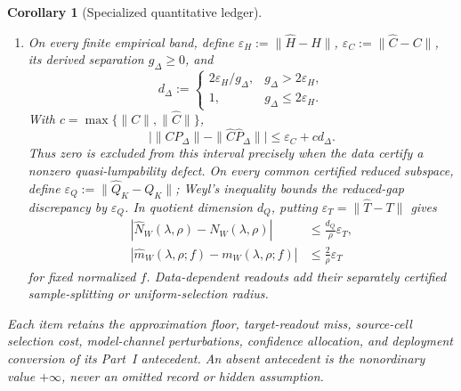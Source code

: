 \documentclass[11pt]{article}
\numberwithin{section}{part}
\theoremstyle{plain}
\newtheorem{corollary}[corollary]{Corollary}
\theoremstyle{definition}
\theoremstyle{remark}
\begin{document}
\begin{corollary}[Specialized quantitative ledger]
\begin{enumerate}[label=\textup{(\roman*)}]
\eqref{eq:wick-effective-dimension-monotone-limit}.  Operator approximation
errors on the \(d_n\)-dimensional carrier are charged by
\eqref{eq:wick-effective-dimension-interval}.  A represented tail estimate
may supply a finite upper envelope; without one, the upper value is
\(+\infty\).  No compactness or trace-class premise is inserted.
\item On every finite empirical band, define
\(\varepsilon_H:=\|\widehat H-H\|\),
\(\varepsilon_C:=\|\widehat C-C\|\), its derived separation
\(g_\Delta\ge0\), and
\[
 d_\Delta:=
 \begin{cases}
  2\varepsilon_H/g_\Delta,&g_\Delta>2\varepsilon_H,\\
  1,&g_\Delta\le2\varepsilon_H.
 \end{cases}
\]
With
\(c=\max\{\|C\|,\|\widehat C\|\}\),
\begin{equation}
 \label{eq:wick-empirical-defect-interval}
 \bigl|\|CP_\Delta\|-\|\widehat C\widehat P_\Delta\|\bigr|
 \le\varepsilon_C+c d_\Delta.
\end{equation}
Thus zero is excluded from this interval precisely when the data certify a
nonzero quasi-lumpability defect.  On every common certified reduced
subspace, define
\(\varepsilon_Q:=\|\widehat Q_K-Q_K\|\); Weyl's inequality bounds the
reduced-gap discrepancy by \(\varepsilon_Q\).  In quotient dimension
\(d_Q\), putting
\(\varepsilon_T=\|\widehat T-T\|\) gives
\begin{align}
 |\widehat N_W(\lambda,\rho)-N_W(\lambda,\rho)|
 &\le\frac{d_Q}{\rho}\varepsilon_T,
 \label{eq:wick-effective-dimension-interval}\\
 |\widehat m_W(\lambda,\rho;f)-m_W(\lambda,\rho;f)|
 &\le\frac{2}{\rho}\varepsilon_T
 \label{eq:wick-capture-interval}
\end{align}
for fixed normalized \(f\).  Data-dependent readouts add their separately
certified sample-splitting or uniform-selection radius.
\end{enumerate}
Each item retains the approximation floor, target-readout miss, source-cell
selection cost, model-channel perturbations, confidence allocation, and
deployment conversion of its Part~I antecedent.  An absent antecedent is the
nonordinary value \(+\infty\), never an omitted record or hidden assumption.
\end{corollary}
\end{document}
